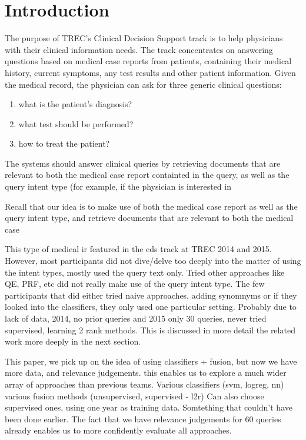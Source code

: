 \chapter{Introduction}
The purpose of TREC's Clinical Decision Support track is to help physicians with their clinical information needs. The track concentrates
on answering questions based on medical case reports from patients, containing their medical history, current symptoms, any test results and other
patient information.
Given the medical record, the physician can ask for three generic clinical questions: 
\begin{enumerate}[label=\arabic*)]
 \item what is the patient's diagnosis?
 \item what test should be performed?
 \item how to treat the patient?
\end{enumerate}

The systems should answer clinical queries by retrieving documents that are relevant to both the medical case report
containted in the query, as well as the query intent type (for example, if the physician is interested in 

Recall that our idea is to make use of both the medical case report as well as the query intent type, and retrieve documents
that are relevant to both the medical case 

This type of medical ir featured in the cds track at TREC 2014 and 2015.
However, most participants did not dive/delve too deeply into the matter of using the intent types, mostly used the query text only.
Tried other approaches like QE, PRF, etc did not really make use of
the query intent type.
The few participants that did either tried naive approaches, adding synomnyms or if they looked into the classifiers, they only used one particular setting.
Probably due to lack of data, 2014, no prior queries and 2015 only 30 queries, never tried supervised, learning 2 rank methods.
This is discussed in more detail the related work more deeply in the next section.

This paper, we pick up on the idea of using classifiers + fusion, but now we have more data, and relevance judgements. 
this enables us to explore a much wider array of approaches than previous teams.
Various classifiers (svm, logreg, nn)
various fusion methods (unsupervised, supervised - l2r)
Can also choose supervised ones, using one year as training data. Somtething that couldn't have been done earlier.
The fact that we have relevance judgements for 60 queries already enables us to more confidently evaluate all approaches.

